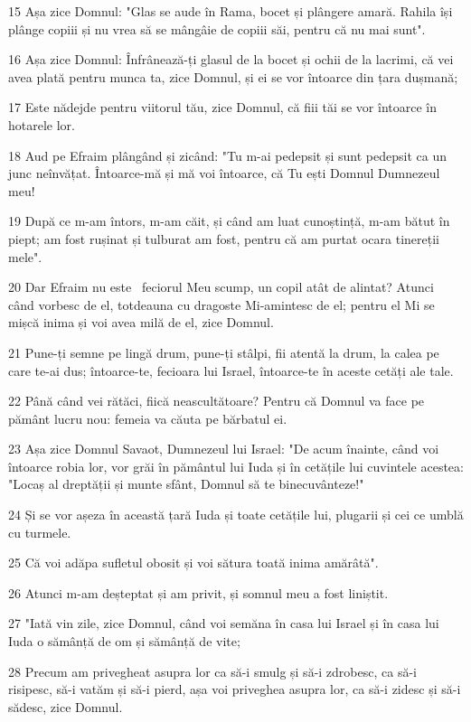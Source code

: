 \par 15 Așa zice Domnul: "Glas se aude în Rama, bocet și plângere amară. Rahila își plânge copiii și nu vrea să se mângâie de copiii săi, pentru că nu mai sunt".
\par 16 Așa zice Domnul: Înfrânează-ți glasul de la bocet și ochii de la lacrimi, că vei avea plată pentru munca ta, zice Domnul, și ei se vor întoarce din țara dușmană;
\par 17 Este nădejde pentru viitorul tău, zice Domnul, că fiii tăi se vor întoarce în hotarele lor.
\par 18 Aud pe Efraim plângând și zicând: "Tu m-ai pedepsit și sunt pedepsit ca un junc neînvățat. Întoarce-mă și mă voi întoarce, că Tu ești Domnul Dumnezeul meu!
\par 19 După ce m-am întors, m-am căit, și când am luat cunoștință, m-am bătut în piept; am fost rușinat și tulburat am fost, pentru că am purtat ocara tinereții mele".
\par 20 Dar Efraim nu este  feciorul Meu scump, un copil atât de alintat? Atunci când vorbesc de el, totdeauna cu dragoste Mi-amintesc de el; pentru el Mi se mișcă inima și voi avea milă de el, zice Domnul.
\par 21 Pune-ți semne pe lingă drum, pune-ți stâlpi, fii atentă la drum, la calea pe care te-ai dus; întoarce-te, fecioara lui Israel, întoarce-te în aceste cetăți ale tale.
\par 22 Până când vei rătăci, fiică neascultătoare? Pentru că Domnul va face pe pământ lucru nou: femeia va căuta pe bărbatul ei.
\par 23 Așa zice Domnul Savaot, Dumnezeul lui Israel: "De acum înainte, când voi întoarce robia lor, vor grăi în pământul lui Iuda și în cetățile lui cuvintele acestea: "Locaș al dreptății și munte sfânt, Domnul să te binecuvânteze!"
\par 24 Și se vor așeza în această țară Iuda și toate cetățile lui, plugarii și cei ce umblă cu turmele.
\par 25 Că voi adăpa sufletul obosit și voi sătura toată inima amărâtă".
\par 26 Atunci m-am deșteptat și am privit, și somnul meu a fost liniștit.
\par 27 "Iată vin zile, zice Domnul, când voi semăna în casa lui Israel și în casa lui Iuda o sămânță de om și sămânță de vite;
\par 28 Precum am privegheat asupra lor ca să-i smulg și să-i zdrobesc, ca să-i risipesc, să-i vatăm și să-i pierd, așa voi priveghea asupra lor, ca să-i zidesc și să-i sădesc, zice Domnul.
